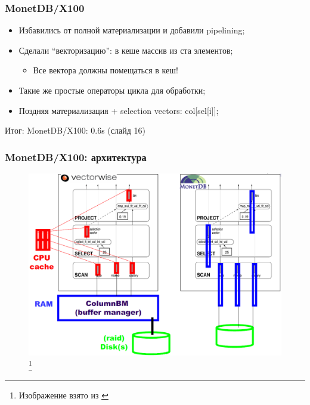 \documentclass{beamer}
\begin{document}
\begin{frame}
\frametitle{MonetDB/X100 \cite{Boncz2005}}

\begin{itemize}
  \setlength\itemsep{1em}
  \item Избавились от полной материализации и добавили pipelining;
  \item Сделали ``векторизацию'': в кеше массив из ста элементов;
  \begin{itemize}
    \item Все вектора должны помещаться в кеш!
  \end{itemize}
  \item Такие же простые операторы цикла для обработки;
  \item Поздняя материализация + selection vectors: col[sel[i]];  
\end{itemize}

Итог: MonetDB/X100: 0.6s (слайд 16)
\end{frame}

\begin{frame}
\frametitle{MonetDB/X100: архитектура}

\begin{figure}[htb]
\includegraphics[width=\textwidth,height=0.750\textheight,keepaspectratio]{x100.png} 
\footnote{\tiny{Изображение взято из \cite{Harizopoulos2009}}}
\end{figure}

\end{frame}
\end{document}
